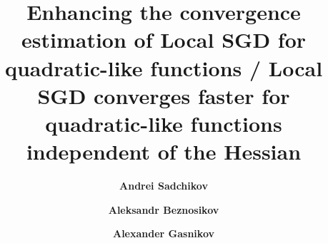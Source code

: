 
\title{\fontsize{12}{14}\selectfont \textbf{Enhancing the convergence estimation of Local SGD for quadratic-like functions / Local SGD converges faster for quadratic-like functions independent of the Hessian}}

\author[1]{\fontsize{11}{14} \textbf{Andrei Sadchikov}}
\author[1, 2]{\fontsize{11}{14} \textbf{Aleksandr Beznosikov}}
\author[1, 3]{\fontsize{11}{14} \textbf{Alexander Gasnikov}}

\date{}